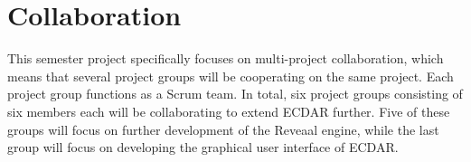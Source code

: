 \section{Collaboration}\label{sec:cooperation}
\commondisclaimer

\noindent This semester project specifically focuses on multi-project collaboration, which means that several project groups will be cooperating on the same project. 
Each project group functions as a Scrum team. 
In total, six project groups consisting of six members each will be collaborating to extend ECDAR further. 
Five of these groups will focus on further development of the Reveaal engine, while the last group will focus on developing the graphical user interface of ECDAR.
